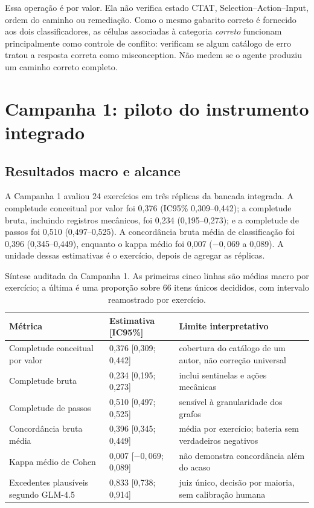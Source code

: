 \documentclass[11pt,a4paper]{article}
\begin{document}
Essa operação é por valor. Ela não verifica estado CTAT, Selection--Action--Input, ordem do caminho ou remediação. Como o mesmo gabarito correto é fornecido aos dois classificadores, as células associadas à categoria \emph{correto} funcionam principalmente como controle de conflito: verificam se algum catálogo de erro tratou a resposta correta como misconception. Não medem se o agente produziu um caminho correto completo.

\section{Campanha 1: piloto do instrumento integrado}

\subsection{Resultados macro e alcance}

A Campanha 1 avaliou 24 exercícios em três réplicas da bancada integrada. A completude conceitual por valor foi 0,376 (IC95\% 0,309--0,442); a completude bruta, incluindo registros mecânicos, foi 0,234 (0,195--0,273); e a completude de passos foi 0,510 (0,497--0,525). A concordância bruta média de classificação foi 0,396 (0,345--0,449), enquanto o kappa médio foi 0,007 ($-0,069$ a 0,089). A unidade dessas estimativas é o exercício, depois de agregar as réplicas.

\begin{table}[H]
\centering
\caption{Síntese auditada da Campanha 1. As primeiras cinco linhas são médias macro por exercício; a última é uma proporção sobre 66 itens únicos decididos, com intervalo reamostrado por exercício.}
\label{tab:s-c1-summary}
\small
\begin{tabularx}{\textwidth}{@{}Y C{2.7cm}P{5.4cm}@{}}
\toprule
Métrica & Estimativa [IC95\%] & Limite interpretativo \\
\midrule
Completude conceitual por valor & 0,376 [0,309; 0,442] & cobertura do catálogo de um autor, não correção universal \\
Completude bruta & 0,234 [0,195; 0,273] & inclui sentinelas e ações mecânicas \\
Completude de passos & 0,510 [0,497; 0,525] & sensível à granularidade dos grafos \\
Concordância bruta média & 0,396 [0,345; 0,449] & média por exercício; bateria sem verdadeiros negativos \\
Kappa médio de Cohen & 0,007 [$-0,069$; 0,089] & não demonstra concordância além do acaso \\
Excedentes plausíveis segundo GLM-4.5 & 0,833 [0,738; 0,914] & juiz único, decisão por maioria, sem calibração humana \\
\bottomrule
\end{tabularx}
\end{table}
\end{document}
